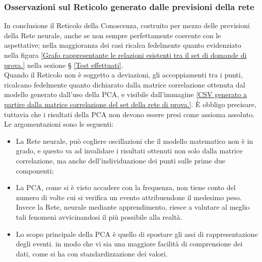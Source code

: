 \subsubsection{Osservazioni sul Reticolo generato dalle previsioni della rete}
\label{Osservazioni generato dalla previsioni della rete}
In conclusione il Reticolo della Conoscenza, costruito per mezzo delle previsioni della Rete neurale, anche se non sempre perfettamente coerente con le aspettative; nella maggioranza dei casi ricalca fedelmente quanto evidenziato nella figura \ref{Grafo rappresentante le relazioni esistenti tra il set di domande di prova.} nella sezione § \ref{Test effettuati}. \\
Quando il Reticolo non \`e soggetto a deviazioni, gli accoppiamenti tra i punti, ricalcano fedelmente quanto dichiarato dalla matrice correlazione ottenuta dal modello generato dall'uso della PCA, e visibile dall'immagine \ref{CSV generato a partire dalla matrice correlazione del set della rete di prova.}.
\`E obbligo precisare, tuttavia che i risultati della PCA non devono essere presi come assioma assoluto. Le argomentazioni sono le seguenti:
\begin{itemize} 
\item La Rete neurale, pu\`o cogliere oscillazioni che il modello matematico non \`e in grado, e questo va ad invalidare i risultati ottenuti non solo dalla matrice correlazione, ma anche dell'individuazione dei punti sulle prime due componenti;
\item La PCA, come si \`e visto accadere con la frequenza, non tiene conto del numero di volte cui si verifica un evento attribuendone il medesimo peso. Invece la Rete, neurale mediante apprendimento, riesce a valutare al meglio tali fenomeni avvicinandosi il pi\`u possibile alla realt\`a.
\item Lo scopo principale della PCA \`e quello di spostare gli assi di rappresentazione degli eventi. in modo che vi sia una maggiore facilit\`a di comprensione dei dati, come si ha con standardizzazione dei valori.
\end{itemize}

